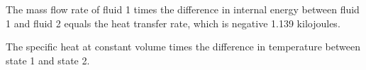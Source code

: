 The mass flow rate of fluid 1 times the difference in internal energy between fluid 1 and fluid 2 equals the heat transfer rate, which is negative 1.139 kilojoules.

The specific heat at constant volume times the difference in temperature between state 1 and state 2.